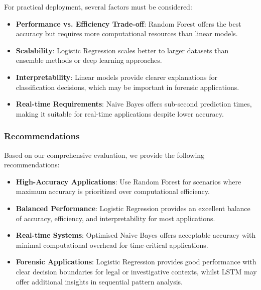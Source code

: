 \documentclass[11pt,a4paper]{article}
\begin{document}
For practical deployment, several factors must be considered:

\begin{itemize}
    \item \textbf{Performance vs. Efficiency Trade-off}: Random Forest offers the best accuracy but requires more computational resources than linear models.
    
    \item \textbf{Scalability}: Logistic Regression scales better to larger datasets than ensemble methods or deep learning approaches.
    
    \item \textbf{Interpretability}: Linear models provide clearer explanations for classification decisions, which may be important in forensic applications.
    
    \item \textbf{Real-time Requirements}: Naive Bayes offers sub-second prediction times, making it suitable for real-time applications despite lower accuracy.
\end{itemize}

\subsubsection{Recommendations}

Based on our comprehensive evaluation, we provide the following recommendations:

\begin{itemize}
    \item \textbf{High-Accuracy Applications}: Use Random Forest for scenarios where maximum accuracy is prioritized over computational efficiency.
    
    \item \textbf{Balanced Performance}: Logistic Regression provides an excellent balance of accuracy, efficiency, and interpretability for most applications.
    
    \item \textbf{Real-time Systems}: Optimised Naive Bayes offers acceptable accuracy with minimal computational overhead for time-critical applications.
    
    \item \textbf{Forensic Applications}: Logistic Regression provides good performance with clear decision boundaries for legal or investigative contexts, whilst LSTM may offer additional insights in sequential pattern analysis.
\end{itemize}
\end{document}
